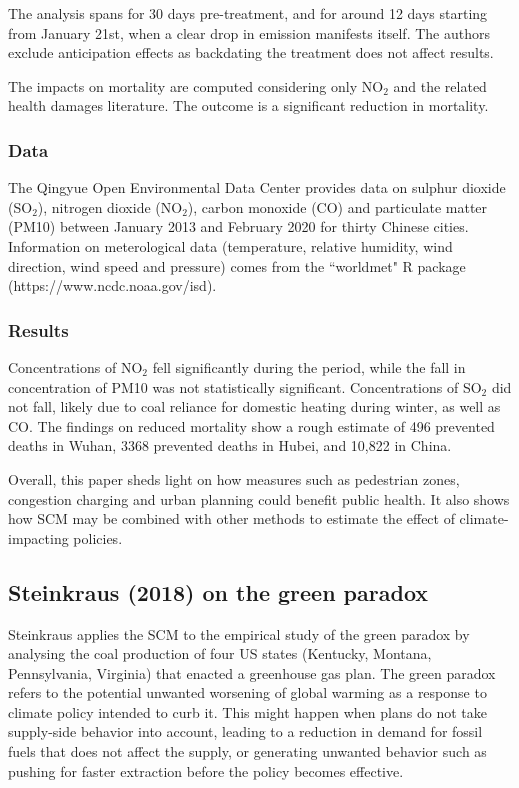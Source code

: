 \documentclass[12pt,a4paper,draft]{article}
\begin{document}
The analysis spans for 30 days pre-treatment, and for around 12 days starting from 
January 21st, when a clear drop in emission manifests itself. 
The authors exclude anticipation effects as backdating the treatment does not affect 
results. 

The impacts on mortality are computed considering only NO$_2$ and the related health 
damages literature. The outcome is a significant reduction in mortality. 


\subsubsection*{Data}
The Qingyue Open Environmental Data Center provides data on sulphur dioxide (SO$_2$), 
nitrogen dioxide (NO$_2$), carbon monoxide (CO) and particulate matter (PM10) between 
January 2013 and February 2020 for thirty Chinese cities. Information on 
meterological data (temperature, relative humidity, wind direction, wind speed and 
pressure) comes from the ``worldmet" R package (https://www.ncdc.noaa.gov/isd).

\subsubsection*{Results}
Concentrations of NO$_2$ fell significantly during the period, while the fall in 
concentration of PM10 was not statistically significant. Concentrations of SO$_2$ 
did not fall, likely due to coal reliance for domestic heating during 
winter, as well as CO. 
The findings on reduced mortality show a rough estimate of 496 prevented deaths in 
Wuhan, 3368 prevented deaths in Hubei, and 10,822 in China.

Overall, this paper sheds light on how measures such as pedestrian zones, congestion 
charging and urban planning could benefit public health. It also shows how SCM may 
be combined with other methods to estimate the effect of climate-impacting policies.


\subsection{Steinkraus (2018) on the green paradox}
Steinkraus applies the SCM to the empirical study of the green paradox by analysing the coal 
production of four US states (Kentucky, Montana, Pennsylvania, Virginia) that enacted a 
greenhouse gas plan. 
The green paradox refers to the potential unwanted worsening of global warming as a 
response to climate policy intended to curb it. 
This might happen when plans do not take supply-side behavior into 
account, leading to a reduction in demand for fossil fuels that does not affect the supply, 
or generating unwanted behavior such as pushing for faster extraction before the policy 
becomes effective. 
\end{document}
